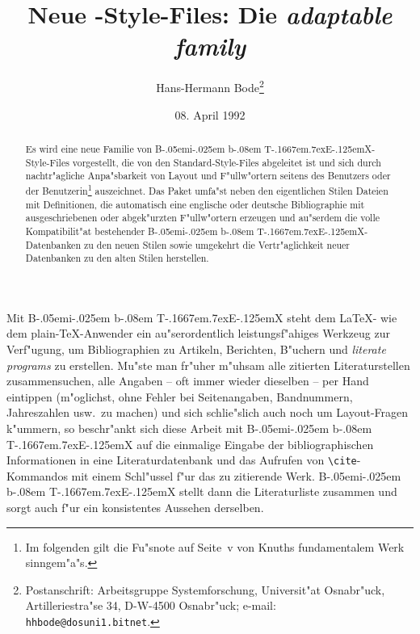\pagestyle{headings}
\frenchspacing
\setlength{\doublerulesep}{0pt}

\title{Neue \BibTeX-Style-Files: Die {\em adaptable family}}
\author{Hans-Hermann Bode\thanks{Postanschrift: Arbeitsgruppe Systemforschung,
  Universit"at Osnabr"uck, Artilleriestra"se 34, D-W-4500 Osnabr"uck; e-mail:
  {\tt hhbode@dosuni1.bitnet}.}}
\date{08. April 1992}

\newcommand{\BibTeX}{{\rm B\kern-.05em{\sc i\kern-.025em b}\kern-.08em
    T\kern-.1667em\lower.7ex\hbox{E}\kern-.125emX}}




\maketitle

\begin{abstract}\footnotesize
  Es wird eine neue Familie von \BibTeX-Style-Files vorgestellt, die von den
  Standard-Style-Files abgeleitet ist und sich durch nachtr"agliche
  Anpa"sbarkeit von Layout und F"ullw"ortern seitens des Benutzers oder der
  Benutzerin\footnote{Im folgenden gilt die Fu"snote auf Seite~v von Knuths
  fundamentalem Werk~\cite{art1} sinngem"a"s.} auszeichnet. Das Paket
  umfa"st neben den eigentlichen Stilen Dateien mit Definitionen, die
  automatisch eine englische oder deutsche Bibliographie mit ausgeschriebenen
  oder abgek"urzten F"ullw"ortern erzeugen und au"serdem die volle
  Kompatibilit"at bestehender \BibTeX-Datenbanken zu den neuen Stilen sowie
  umgekehrt die Vertr"aglichkeit neuer Datenbanken zu den alten Stilen
  herstellen.
\end{abstract}


Mit {\BibTeX} steht dem \LaTeX- wie dem plain-\TeX-Anwender ein
au"serordentlich leistungsf"ahiges Werkzeug zur Verf"ugung, um
Bibliographien zu Artikeln, Berichten, B"uchern und {\em literate
programs\/} zu erstellen. Mu"ste man fr"uher m"uhsam alle zitierten
Literaturstellen zusammensuchen, alle Angaben -- oft immer wieder dieselben
-- per Hand eintippen (m"oglichst, ohne Fehler bei Seitenangaben,
Bandnummern, Jahreszahlen usw.~zu machen) und sich schlie"slich auch noch um
Layout-Fragen k"ummern, so beschr"ankt sich diese Arbeit mit {\BibTeX} auf
die einmalige Eingabe der bibliographischen Informationen in eine
Literaturdatenbank und das Aufrufen von \verb|\cite|-Kommandos mit einem
Schl"ussel f"ur das zu zitierende Werk. {\BibTeX} stellt dann die
Literaturliste zusammen und sorgt auch f"ur ein konsistentes Aussehen
derselben.

